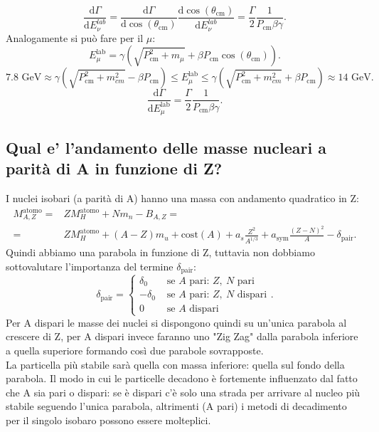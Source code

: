 \[
	\frac{\mbox{d} \Gamma}{\mbox{d} E_{\nu}^{lab}} = 
	\frac{\mbox{d} \Gamma}{\text{d}\cos\left( \theta_{\text{cm}} \right) } \frac{\text{d}\cos\left( \theta_{\text{cm}} \right) }{\mbox{d} E_{\nu}^{lab}} 
	= \frac{\Gamma}{2}\frac{1}{P_{\text{cm}}\beta \gamma}
.\] 
Analogamente si può fare per il $\mu$:
\[
	E_{\mu}^{\text{lab}}=\gamma\left( \sqrt{P_{\text{cm}}^2+m_{\mu}} + \beta P_{\text{cm}}\cos\left( \theta_{\text{cm}}\right)\right)
.\] 
\[
	7.8 \text{ GeV} \approx \gamma\left( \sqrt{P_{\text{cm}}^2 + m_{cm}^2} - \beta P_{\text{cm}} \right) \le E_{\mu}^{\text{lab}} \le 
	\gamma\left( \sqrt{P_{\text{cm}}^2 + m_{cm}^2} + \beta P_{\text{cm}} \right)  \approx 14 \text{ GeV}
.\] 
\[
\frac{\mbox{d} \Gamma}{\mbox{d} E_{\mu}^{\text{lab}}} = \frac{\Gamma}{2}\frac{1}{P_{\text{cm}}\beta \gamma}
.\] 

\subsection[\hspace{2mm} Andamento masse nucleari a parità di A in funzione di Z]{Qual e' l'andamento delle masse nucleari a parità di A in funzione di Z?}
I nuclei isobari (a parità di A) hanno una massa con andamento quadratico in Z:
\begin{align*}
	M_{A,Z}^{\text{atomo}} =& ZM_H^{\text{atomo}} + Nm_n - B_{A,Z} =\\
	=&ZM_H^{\text{atomo}}+\left(A-Z\right)m_u+\text{cost}\left(A\right)+a_s\frac{Z^2}{A^{1/3}}+a_{\text{sym}}\frac{\left(Z-N\right)^2}{A}-\delta_{\text{pair}}
.\end{align*}
Quindi abbiamo una parabola in funzione di Z, tuttavia non dobbiamo sottovalutare l'importanza del termine $\delta_{\text{pair}}$:
\[
	\delta_{\text{pair}}= 
	\begin{cases}
		\delta_0 & \text{ se } A \text{ pari: } Z, \ N \text{ pari}  \\ 
		-\delta_0 & \text{ se } A \text{ pari: } Z, \ N \text{ dispari}\\
		0 & \text{ se } A \text{ dispari}
	\end{cases}
.\] 
Per A dispari le masse dei nuclei si dispongono quindi su un'unica parabola al crescere di Z, per A dispari invece faranno uno "Zig Zag" dalla parabola inferiore a quella superiore formando così due parabole sovrapposte.\\
La particella più stabile sarà quella con massa inferiore: quella sul fondo della parabola. Il modo in cui le particelle decadono è fortemente influenzato dal fatto che A sia pari o dispari: se è dispari c'è solo una strada per arrivare al nucleo più stabile seguendo l'unica parabola, altrimenti (A pari) i metodi di decadimento per il singolo isobaro possono essere molteplici.\\
